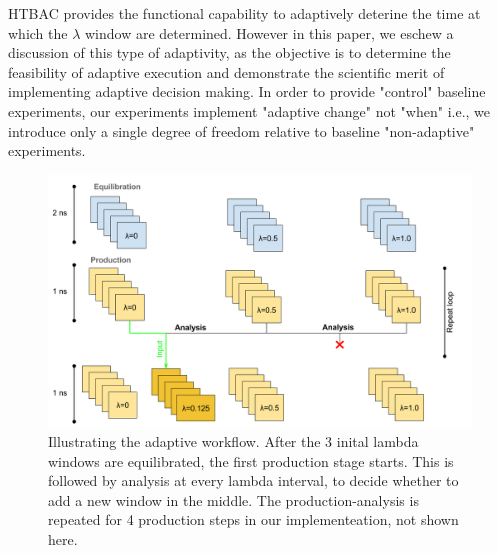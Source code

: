 

HTBAC provides the functional capability to adaptively deterine the time at
which the $\lambda$ window are determined. However in this paper, we eschew a
discussion of this type of adaptivity, as the objective is to determine the
feasibility of adaptive execution and demonstrate the scientific merit of
implementing adaptive decision making. In order to provide "control" baseline
experiments, our experiments implement "adaptive change" not "when" i.e., we
introduce only a single degree of freedom relative to baseline "non-adaptive"
experiments.

\begin{figure}
  \centering
   \includegraphics[width=\columnwidth]{figures/Adaptive_TIES_1.png}
  \caption{Illustrating the adaptive workflow. After the 3 inital lambda windows are equilibrated, the first production stage starts. This is followed by analysis at every lambda interval, to decide whether to add a new window in the middle. The production-analysis is repeated for 4 production steps in our implementeation, not shown here.}
\label{fig:adaptive_TIES}
\end{figure}


